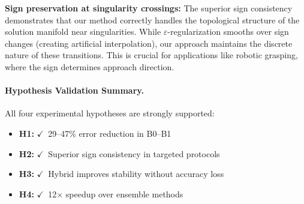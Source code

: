 \documentclass[twoside,11pt]{article}
\begin{document}
\textbf{Sign preservation at singularity crossings:} The superior sign consistency demonstrates that our method correctly handles the topological structure of the solution manifold near singularities. While $\varepsilon$-regularization smooths over sign changes (creating artificial interpolation), our approach maintains the discrete nature of these transitions. This is crucial for applications like robotic grasping, where the sign determines approach direction.

\paragraph{Hypothesis Validation Summary.}
All four experimental hypotheses are strongly supported:
\begin{itemize}
\item \textbf{H1:} $\checkmark$~29--47\% error reduction in B0--B1
\item \textbf{H2:} $\checkmark$~Superior sign consistency in targeted protocols
\item \textbf{H3:} $\checkmark$~Hybrid improves stability without accuracy loss
\item \textbf{H4:} $\checkmark$~12$\times$ speedup over ensemble methods
\end{itemize}








\end{document}
